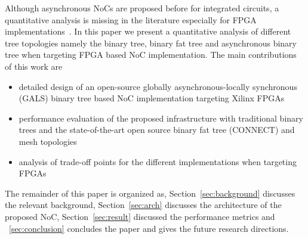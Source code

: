Although asynchronous NoCs are proposed before for integrated circuits, a quantitative analysis is missing in the literature especially for FPGA implementations~\cite{Bjerregaard2005, USP2011}.
In this paper we present a quantitative analysis of different tree topologies namely the binary tree, binary fat tree and asynchronous binary tree when targeting FPGA based NoC implementation. 
The main contributions of this work are
\begin{itemize}
\item detailed design of an open-source globally asynchronous-locally synchronous (GALS) binary tree based NoC implementation targeting Xilinx FPGAs
\item performance evaluation of the proposed infrastructure with traditional binary trees and the state-of-the-art open source binary fat tree (CONNECT) and mesh topologies
\item analysis of trade-off points for the different implementations when targeting FPGAs
\end{itemize}
The remainder of this paper is organized as, Section~\ref{sec:background} discusses the relevant background, Section~\ref{sec:arch} discusses the architecture of the proposed NoC, Section~\ref{sec:result} discussed the performance metrics and ~\ref{sec:conclusion} concludes the paper and gives the future research directions.